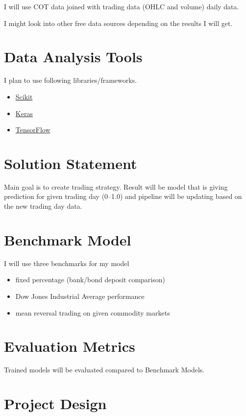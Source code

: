 \documentclass[final,2p]{elsarticle}
\begin{document}
I will use COT data joined with trading data (OHLC and volume) daily data.

I might look into other free data sources depending on the results I will get.

\section{Data Analysis Tools}

I plan to use following libraries/frameworks.

\begin{itemize}
    \item \href{https://scikit-learn.org/}{Scikit}
    \item \href{https://keras.io/}{Keras}
    \item \href{https://www.tensorflow.org/}{TensorFlow}
\end{itemize}

\section{Solution Statement}

Main goal is to create trading strategy. Result will be model that is giving prediction for given trading day (0--1.0) and pipeline will be updating based on the new trading day data.

\section{Benchmark Model}

I will use three benchmarks for my model

\begin{itemize}
    \item fixed percentage (bank/bond deposit comparison)
    \item Dow Jones Industrial Average performance
    \item mean reversal trading on given commodity markets
\end{itemize}

\section{Evaluation Metrics}

Trained models will be evaluated compared to Benchmark Models.

\section{Project Design}
\end{document}
